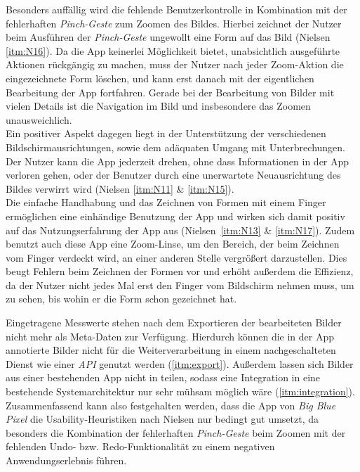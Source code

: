 Besonders auffällig wird die fehlende Benutzerkontrolle in Kombination mit der fehlerhaften \emph{Pinch-Geste} zum Zoomen des Bildes.
Hierbei zeichnet der Nutzer beim Ausführen der \emph{Pinch-Geste} ungewollt eine Form auf das Bild (Nielsen \autoref{itm:N16}).
Da die App keinerlei Möglichkeit bietet, unabsichtlich ausgeführte Aktionen rückgängig zu machen, muss der Nutzer nach jeder Zoom-Aktion die eingezeichnete Form löschen, und kann erst danach mit der eigentlichen Bearbeitung der App fortfahren.
Gerade bei der Bearbeitung von Bilder mit vielen Details ist die Navigation im Bild und insbesondere das Zoomen unausweichlich. \\

Ein positiver Aspekt dagegen liegt in der Unterstützung der verschiedenen Bildschirmausrichtungen, sowie dem adäquaten Umgang mit Unterbrechungen.
Der Nutzer kann die App jederzeit drehen, ohne dass Informationen in der App verloren gehen, oder der Benutzer durch eine unerwartete Neuausrichtung des Bildes verwirrt wird (Nielsen \autoref{itm:N11} \& \autoref{itm:N15}). \\

Die einfache Handhabung und das Zeichnen von Formen mit einem Finger ermöglichen eine einhändige Benutzung der App und wirken sich damit positiv auf das Nutzungserfahrung der App aus (Nielsen~\autoref{itm:N13} \& \autoref{itm:N17}).
Zudem benutzt auch diese App eine Zoom-Linse, um den Bereich, der beim Zeichnen vom Finger verdeckt wird, an einer anderen Stelle vergrößert darzustellen.
Dies beugt Fehlern beim Zeichnen der Formen vor und erhöht außerdem die Effizienz, da der Nutzer nicht jedes Mal erst den Finger vom Bildschirm nehmen muss, um zu sehen, bis wohin er die Form schon gezeichnet hat. \\

Eingetragene Messwerte stehen nach dem Exportieren der bearbeiteten Bilder nicht mehr als Meta-Daten zur Verfügung.
Hierdurch können die in der App annotierte Bilder nicht für die Weiterverarbeitung in einem nachgeschalteten Dienst wie einer \emph{API} genutzt werden (\autoref{itm:export}).
Außerdem lassen sich Bilder aus einer bestehenden App nicht in \pm{} teilen, sodass eine Integration in eine bestehende Systemarchitektur nur sehr mühsam möglich wäre (\autoref{itm:integration}). \\

Zusammenfassend kann also festgehalten werden, dass die App \pm{} von \emph{Big Blue Pixel} die Usability-Heuristiken nach Nielsen nur bedingt gut umsetzt, da besonders die Kombination der fehlerhaften \emph{Pinch-Geste} beim Zoomen mit der fehlenden Undo- bzw. Redo-Funktionalität zu einem negativen Anwendungserlebnis führen.
